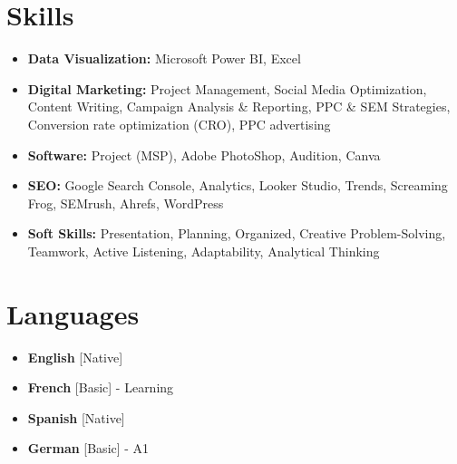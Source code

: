 \documentclass[11pt,a4paper,sans]{moderncv}
\begin{document}
\section{Skills}
 {\begin{itemize}[label=\textbullet]
	  \item {\textbf{Data Visualization:} Microsoft Power BI, Excel}
	  \item {\textbf{Digital Marketing:} Project Management, Social Media Optimization, Content Writing, Campaign Analysis \& Reporting, PPC \& SEM Strategies, Conversion rate optimization (CRO), PPC advertising}
	  \item {\textbf{Software:} Project (MSP), Adobe PhotoShop, Audition, Canva}
	  \item {\textbf{SEO:} Google Search Console, Analytics, Looker Studio, Trends, Screaming Frog, SEMrush, Ahrefs, WordPress}
	  \item {\textbf{Soft Skills:} Presentation, Planning, Organized, Creative Problem-Solving, Teamwork, Active Listening, Adaptability, Analytical Thinking}
  \end{itemize}}

\section{Languages}
\begin{multicols}{2}
	\begin{itemize}[label=\textbullet]
		\item \textbf{English} [Native]
		\item {\textbf{French} [Basic] - Learning}
		\item {\textbf{Spanish} [Native]}
		\item {\textbf{German} [Basic] - A1}
	\end{itemize}
\end{multicols}
\end{document}
